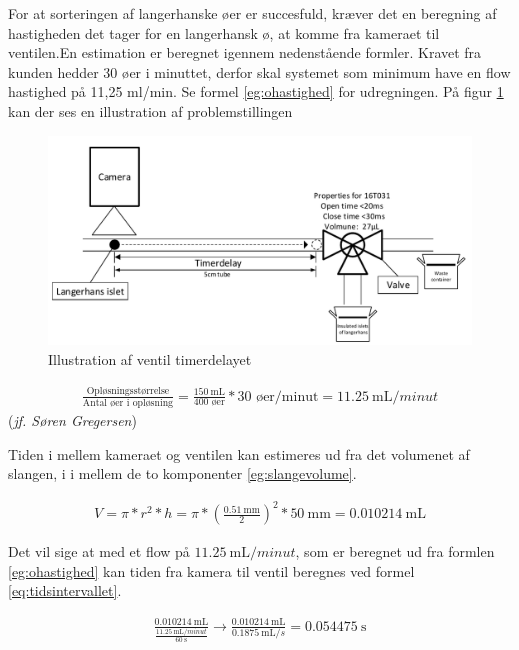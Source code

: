 For at sorteringen af langerhanske øer er succesfuld, kræver det en beregning af hastigheden det tager for en langerhansk ø, at komme fra kameraet til ventilen.En estimation er beregnet igennem nedenstående formler. Kravet fra kunden hedder 30 øer i minuttet, derfor skal systemet som minimum have en flow hastighed på 11,25 ml/min. Se formel \ref{eg:ohastighed} for udregningen. På figur \ref{fig:tidsintervalventil} kan der ses en illustration af problemstillingen 

\begin{figure}[H]
	\centering
	\includegraphics[width=1\textwidth]{billeder/tidsinterval.pdf}
	\caption{Illustration af ventil timerdelayet}
	\label{fig:tidsintervalventil}
\end{figure}

\begin{align}
\frac{\text{Opløsningsstørrelse}}{\text{Antal øer i opløsning}} = \frac{\SI{150}{\milli\liter}}{400\text{ øer}}*30\text{ øer/minut} = \SI{11,25}{\milli\liter/minut} 
\label{eg:ohastighed}
\end{align}(\textit{jf. Søren Gregersen})

Tiden i mellem kameraet og ventilen kan estimeres ud fra det volumenet af slangen, i i mellem de to komponenter \ref{eg:slangevolume}.

\begin{align}
V=\pi*r^2*h=\pi*(\frac{\SI{0,51}{\milli\metre}}{2})^2*\SI{50}{\milli\metre}=\SI{0,010214}{\milli\liter}
\label{eg:slangevolume}
\end{align}

Det vil sige at med et flow på $\SI{11,25}{\milli\liter/minut}$, som er beregnet ud fra formlen \ref{eg:ohastighed} kan tiden fra kamera til ventil beregnes ved formel \ref{eq:tidsintervallet}. 
 
\begin{align}
\frac{\SI{0,010214}{\milli\liter}}{\frac{\SI{11,25}{\milli\liter/minut}}{\SI{60}{\second}}}\to\frac{\SI{0,010214}{\milli\liter}}{\SI{0,1875}{\milli\liter/s}}=\SI{0.054475}{\second}
\label{eq:tidsintervallet}
\end{align} 

